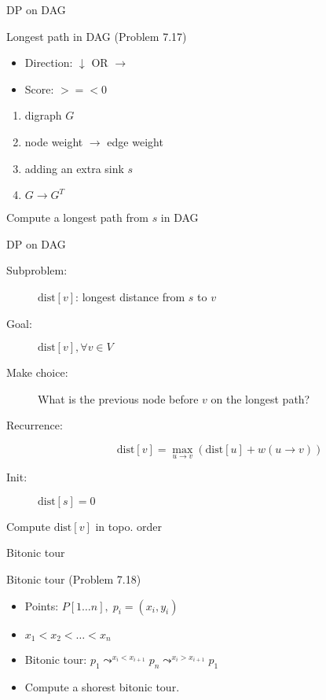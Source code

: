 \begin{frame}{DP on DAG}
  \begin{exampleblock}{Longest path in DAG (Problem 7.17)}
	\begin{itemize}
	  \item Direction: $\downarrow$ OR $\rightarrow$
	  \item Score: $>=< 0$
	\end{itemize}
  \end{exampleblock}

  \pause
  \begin{enumerate}
	\item digraph $G$
	\item node weight $\to$ edge weight
	\item adding an extra sink $s$
	\item $G \to G^{T}$
  \end{enumerate}

  \pause
  \centerline{Compute a longest path from $s$ in DAG}
\end{frame}
\begin{frame}{DP on DAG}
  \begin{description}
	\item[Subproblem:] $\text{dist}[v]$: longest distance from $s$ to $v$ 
	\item[Goal:] $\text{dist}[v], \forall v \in V$
	  \pause
	\item[Make choice:] What is the previous node before $v$ on the longest path?
	\item[Recurrence:] 
	  \[
		\text{dist}[v] = \max_{u \to v} \left(\text{dist}[u] + w(u \to v)\right) 
	  \]
	  \pause
	\item[Init:] $\text{dist}[s] = 0$
  \end{description}

  \pause
  \vspace{0.60cm}
  \centerline{Compute $\text{dist}[v]$ in topo. order}
\end{frame}
\begin{frame}{Bitonic tour}
  \begin{exampleblock}{Bitonic tour (Problem 7.18)}
	\begin{itemize}
	  \item Points: $P[1 \dots n], \; p_i = (x_i, y_i)$
	  \item $x_1 < x_2 < \dots < x_n$
	  \item Bitonic tour: $p_1 \leadsto^{x_i < x_{i+1}} p_n \leadsto^{x_i > x_{i+1}} p_1$
	  \item Compute a shorest bitonic tour.
	\end{itemize}
  \end{exampleblock}

\end{frame}
